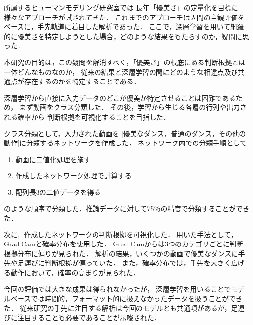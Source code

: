 所属するヒューマンモデリング研究室では
長年「優美さ」の定量化を目標に様々なアプローチが試されてきた．
これまでのアプローチは人間の主観評価をベースに，手先軌道に着目した解析であった．
ここで，深層学習を用いて網羅的に優美さを特定しようとした場合，どのような結果をもたらすのか，疑問に思った．

本研究の目的は，この疑問を解消すべく，「優美さ」の根底にある判断根拠とは一体どんなものなのか，
従来の結果と深層学習の間にどのような相違点及び共通点が存在するのかを特定することである．

深層学習から直接に入力データのどこが優美か特定させることは困難であるため，
まず動画をクラス分類した．
その後，学習から生じる各層の行列や出力される確率から
判断根拠を可視化することを目指した．

クラス分類として，入力された動画を
[優美なダンス，普通のダンス，その他の動作]に分類するネットワークを作成した．
ネットワーク内での分類手順として
\begin{enumerate}
  \item 動画に二値化処理を施す
  \item 作成したネットワーク処理で計算する
  \item 配列長3の二値データを得る
\end{enumerate}
のような順序で分類した．推論データに対して75％の精度で分類することができた．

次に，作成したネットワークの判断根拠を可視化した．
用いた手法として，Grad Camと確率分布を使用した．
Grad Camからは3つのカテゴリごとに判断根拠分布に偏りが見られた．
解析の結果，いくつかの動画で優美なダンスに手先や足運びに判断根拠が偏っていた．
また，確率分布では，手先を大きく広げる動作において，確率の高まりが見られた．

今回の評価では大きな成果は得られなかったが，
深層学習を用いることでモデルベースでは時間的，フォーマット的に扱えなかったデータを扱うことができた．
従来研究の手先に注目する解析は今回のモデルとも共通項があるが，足運びに注目することも必要であることが示唆された．